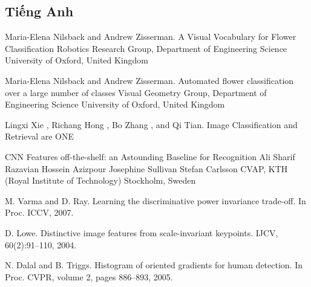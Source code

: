 \documentclass[12pt]{report}
\begin{document}
		\begin{thebibliography}{9}
																																																																																																			
			\section*{Tiếng Anh}
																																																																																																
			Maria-Elena Nilsback and Andrew Zisserman. A Visual Vocabulary for Flower Classification Robotics Research Group, Department of Engineering Science University of Oxford, United Kingdom													
																																																																																																			
			Maria-Elena Nilsback and Andrew Zisserman. Automated flower classification over a large number of classes Visual Geometry Group, Department of Engineering Science University of Oxford, United Kingdom
																																																																																																
			Lingxi Xie , Richang Hong , Bo Zhang , and Qi Tian. Image Classification and Retrieval are ONE
																																																																																																
			CNN Features off-the-shelf: an Astounding Baseline for Recognition Ali Sharif Razavian Hossein Azizpour Josephine Sullivan Stefan Carlsson CVAP, KTH (Royal Institute of Technology) Stockholm, Sweden
																																																																																															
			M. Varma and D. Ray. Learning the discriminative power invariance trade-off. In Proc. ICCV, 2007.
																																																																																										
			D. Lowe. Distinctive image features from scale-invariant keypoints. IJCV, 60(2):91–110, 2004.
																																																																																																		
			N. Dalal and B. Triggs. Histogram of oriented gradients for human detection. In Proc. CVPR, volume 2, pages 886–893, 2005.
																																																																																																

\end{thebibliography}
\end{document}
